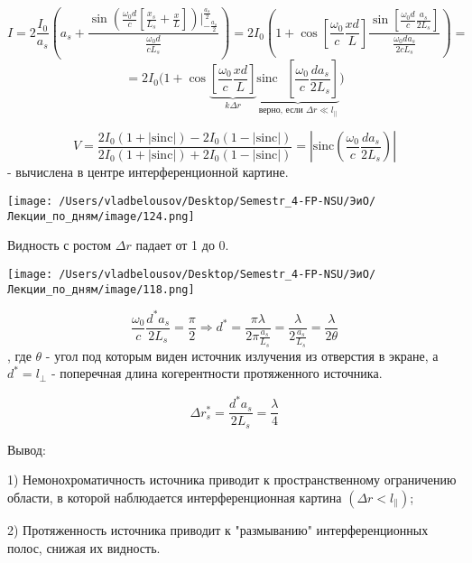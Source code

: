 \documentclass[12pt, a4paper]{report}
\begin{document}
\fi


\[ I = 2 \frac{I_0 }{a_s } \left( a_s + \frac{\sin \left( \frac{\omega_0 d }{c } \left[ \frac{x_s}{L_s} + \frac{x}{L }   \right]  \right)  \bigg | ^{\frac{a_s}{2 } }_{-\frac{a_s}{2 } } }{\frac{\omega_0 d }{c L_s} }  \right) = 2 I_0 \left( 1  + \cos \left[ \frac{\omega_0}{c } \frac{xd}{L}  \right] \frac{\sin \left[ \frac{\omega_0 d }{c } \frac{a_s }{2 L_s }   \right]}{\frac{\omega_0 d a_s  }{2c L_s} }  \right)  =\] 
\[ = 2 I_0 \bigg( 1 + \cos  \underbrace{\left[ \frac{\omega_0}{c} \frac{x d }{L }   \right]}_{k \Delta r } \underbrace{ \mathrm{sinc } \text{ } \left[ \frac{\omega_0}{c }  \frac{d a_s}{2 L_s}  \right]}_{\text{верно, если } \Delta r \ll l_{\parallel}  } \bigg) \] 

\[ V = \frac{2I_0 (1+ |\mathrm{sinc}|)- 2I_0 (1 - |\mathrm{sinc}  |)}{2 I_0 (1 + |\mathrm{sinc}  |) + 2 I_0 (1 - |\mathrm{sinc}  |)} = \left\lvert \mathrm{sinc }  \left( \frac{\omega_0}{c} \frac{d a_s }{2 L_s}  \right)  \right\rvert   \] 
- вычислена в центре  интерференционной картине.

\begin{center}
    \texttt{[image: /Users/vladbelousov/Desktop/Semestr\_4-FP-NSU/ЭиО/Лекции\_по\_дням/image/124.png]}
\end{center}  
Видность с ростом \( \Delta r  \) падает от 1 до 0.

\begin{center}
    \texttt{[image: /Users/vladbelousov/Desktop/Semestr\_4-FP-NSU/ЭиО/Лекции\_по\_дням/image/118.png]}
\end{center}  

\[ \frac{\omega_0}{c }  \frac{d^* a_s }{2 L_s } = \frac{\pi}{2 }  \Rightarrow d^* = \frac{\pi \lambda }{2 \pi \frac{a_s}{L_s}  } = \frac{\lambda}{2 \frac{a_s}{L_s}  }  = \frac{\lambda}{2 \theta}   \]
, где \( \theta  \) - угол под которым виден источник излучения из отверстия в экране, а \( d^* = l_{\perp } \) - поперечная длина когерентности   протяженного источника.

\[ \Delta r_s^* = \frac{d^* a_s }{2 L_s} = \frac{\lambda}{4}   \] 

Вывод: 

1) Немонохроматичность источника приводит к пространственному ограничению области, в которой наблюдается интерференционная картина \( (\Delta r < l_{\parallel} ) \);

2) Протяженность источника приводит к "размыванию" интерференционных полос, снижая их видность.
\end{document}
